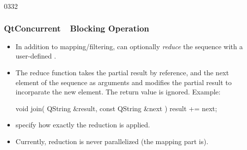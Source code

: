 \begin{slide}[fragile]{0332}
\frametitle{QtConcurrent~\textemdash~Blocking Operation}
  \begin{itemize}
  \item In addition to mapping/filtering,  can optionally
    \emph{reduce} the sequence with a user-defined \emph{}.
  \item The reduce function takes the partial result by reference,
    and the next element of the sequence as arguments and modifies the
    partial result to incorparate the new element. The return value is
    ignored. Example:%
\begin{cpp}
  void join( QString &result, const QString &next ) {
    result += next;
  }
\end{cpp}
\item {} specify how exactly the
  reduction is applied.
\item Currently, reduction is never parallelized (the mapping part is).
  \end{itemize}
\end{slide}

